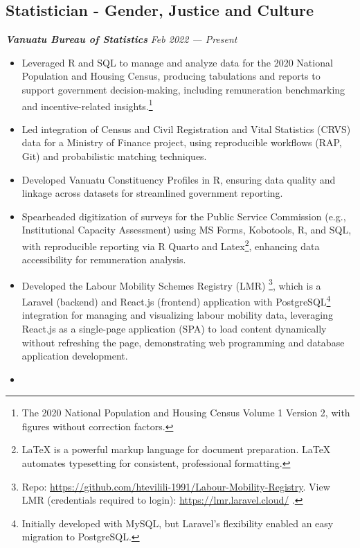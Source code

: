 \documentclass[
  letterpaper,
  DIV=11,
  numbers=noendperiod]{scrartcl}
\providecommand{\tightlist}{%
  \setlength{\itemsep}{0pt}\setlength{\parskip}{0pt}}
\begin{document}
\subsection{Statistician - Gender, Justice and
Culture}\label{statistician---gender-justice-and-culture}

\textbf{\emph{Vanuatu Bureau of Statistics}} {\emph{Feb 2022 ---
Present}}\\

\begin{itemize}
\tightlist
\item
  Leveraged R and SQL to manage and analyze data for the 2020 National
  Population and Housing Census, producing tabulations and reports to
  support government decision-making, including remuneration
  benchmarking and incentive-related insights.\footnote{The 2020
    National Population and Housing Census Volume 1 Version 2, with
    figures without correction factors.}
\item
  Led integration of Census and Civil Registration and Vital Statistics
  (CRVS) data for a Ministry of Finance project, using reproducible
  workflows (RAP, Git) and probabilistic matching techniques.
\item
  Developed Vanuatu Constituency Profiles in R, ensuring data quality
  and linkage across datasets for streamlined government reporting.
\item
  Spearheaded digitization of surveys for the Public Service Commission
  (e.g., Institutional Capacity Assessment) using MS Forms, Kobotools,
  R, and SQL, with reproducible reporting via R Quarto and
  Latex\footnote{LaTeX is a powerful markup language for document
    preparation. LaTeX automates typesetting for consistent,
    professional formatting.}, enhancing data accessibility for
  remuneration analysis.
\item
  Developed the Labour Mobility Schemes Registry (LMR) \footnote{Repo:
    \url{https://github.com/htevilili-1991/Labour-Mobility-Registry}.
    View LMR (credentials required to login):
    \url{https://lmr.laravel.cloud/} .}, which is a Laravel (backend)
  and React.js (frontend) application with PostgreSQL\footnote{Initially
    developed with MySQL, but Laravel's flexibility enabled an easy
    migration to PostgreSQL.} integration for managing and visualizing
  labour mobility data, leveraging React.js as a single-page application
  (SPA) to load content dynamically without refreshing the page,
  demonstrating web programming and database application development.
\item

\end{itemize}
\end{document}
